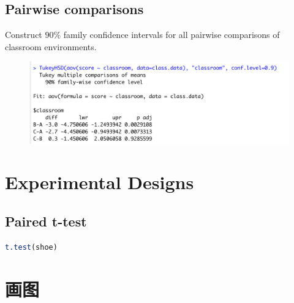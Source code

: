 \documentclass[11pt,a4paper]{article}
\begin{document}
\subsection{Pairwise comparisons}
Construct $90\%$ family confidence intervals for all pairwise comparisons of classroom environments.
\begin{center}\begin{figure}[htbp]
  \centering
  \includegraphics[scale=0.3]{aov}
  \caption{}
  \label{}
\end{figure}\end{center}



\section{ Experimental Designs}
\subsection{ Paired t-test}
\begin{lstlisting}[language=R]
t.test(shoe)
\end{lstlisting}





































\section{画图}
\end{document}
